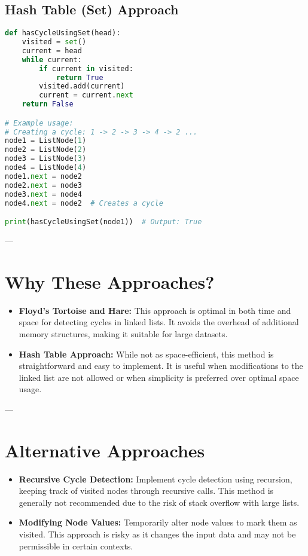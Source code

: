 \subsection*{Hash Table (Set) Approach}
\begin{fullwidth}
\begin{lstlisting}[language=Python]
def hasCycleUsingSet(head):
    visited = set()
    current = head
    while current:
        if current in visited:
            return True
        visited.add(current)
        current = current.next
    return False

# Example usage:
# Creating a cycle: 1 -> 2 -> 3 -> 4 -> 2 ...
node1 = ListNode(1)
node2 = ListNode(2)
node3 = ListNode(3)
node4 = ListNode(4)
node1.next = node2
node2.next = node3
node3.next = node4
node4.next = node2  # Creates a cycle

print(hasCycleUsingSet(node1))  # Output: True
\end{lstlisting}
\end{fullwidth}

---

\section*{Why These Approaches?}
\begin{itemize}
    \item \textbf{Floyd’s Tortoise and Hare:} This approach is optimal in both time and space for detecting cycles in linked lists. It avoids the overhead of additional memory structures, making it suitable for large datasets.
    \item \textbf{Hash Table Approach:} While not as space-efficient, this method is straightforward and easy to implement. It is useful when modifications to the linked list are not allowed or when simplicity is preferred over optimal space usage.
\end{itemize}

---

\section*{Alternative Approaches}
\begin{itemize}
    \item \textbf{Recursive Cycle Detection:} Implement cycle detection using recursion, keeping track of visited nodes through recursive calls. This method is generally not recommended due to the risk of stack overflow with large lists.
    \item \textbf{Modifying Node Values:} Temporarily alter node values to mark them as visited. This approach is risky as it changes the input data and may not be permissible in certain contexts.
\end{itemize}

